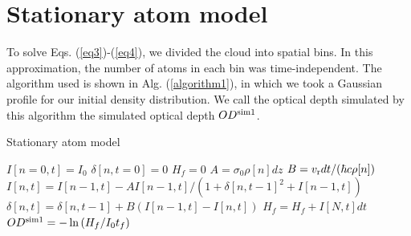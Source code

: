 \section{Stationary atom model}
To solve Eqs. (\ref{eq3})-(\ref{eq4}), we divided the cloud into spatial bins.  In this approximation, the number of atoms in each bin was time-independent.  The algorithm used is shown in Alg. (\ref{algorithm1}), in which we took a Gaussian profile for our initial density distribution. We call the optical depth simulated by this algorithm the simulated optical depth $OD^{\rm{sim1}}$.

\begin{algorithm}
\caption{Stationary atom model}
\label{algorithm1}
\begin{algorithmic}
\STATE $I[n=0,t]=I_0$ 
\STATE $\delta[n, t=0]=0$ 
\STATE $H_f=0$ 
 \STATE $A=\sigma_0\rho[n] dz$ 
 \STATE $B=v_{\rm{r}} dt/(\hbar c \rho[n])$  
\STATE $I[n,t]=I[n-1,t] - A I[n-1,t]/(1+\delta[n,t-1]^2+I[n-1,t])$  
\STATE $\delta[n,t]=\delta[n,t-1]+B\left(I[n-1,t]-I[n,t]\right)$  
\ENDFOR
\STATE $H_f =H_f+ I[N,t]dt$ 
\ENDFOR
\STATE $OD^{\rm{sim1}}=-\ln{(H_f/I_0t_f)}$
\end{algorithmic}
\end{algorithm}

